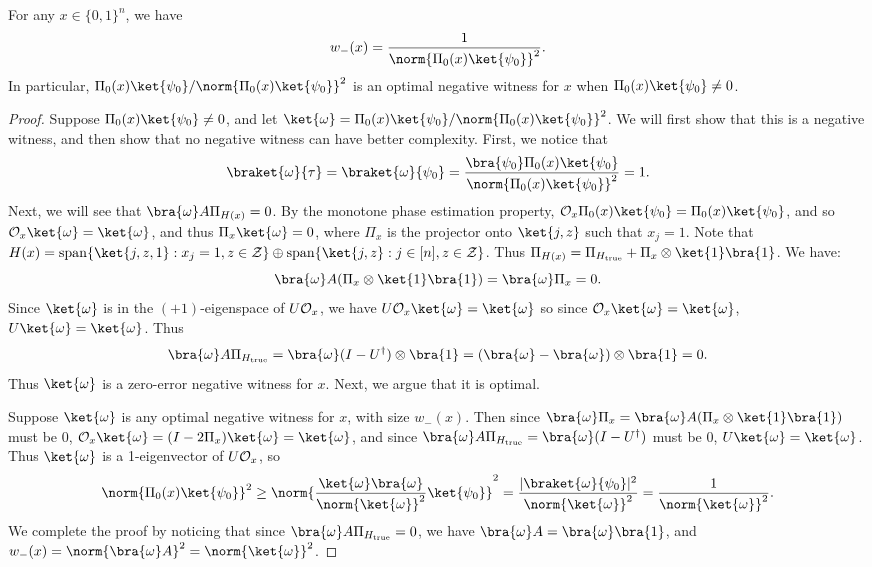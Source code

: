\documentclass{toc}
\begin{document}
\begin{lemma}\label{lem:monotone-alg-neg}
For any $x\in \{0,1\}^n$, we have
$$w_-(x) = \frac{1}{\norm{\Pi_0(x)\ket{\psi_0}}^2}.$$
In particular, $\Pi_0(x)\ket{\psi_0}/\norm{\Pi_0(x)\ket{\psi_0}}^2$ is an optimal negative witness for $x$ when \mbox{$\Pi_0(x)\ket{\psi_0}\neq 0$.} 
\end{lemma}
\begin{proof}
Suppose $\Pi_0(x)\ket{\psi_0}\neq 0$, and let $\ket{\omega}=\Pi_0(x)\ket{\psi_0}/\norm{\Pi_0(x)\ket{\psi_0}}^2$. We will first show that this is a negative witness, and then show that no negative witness can have better complexity. First, we notice that
$$\braket{\omega}{\tau}=\braket{\omega}{\psi_0}=\frac{\bra{\psi_0}\Pi_0(x)\ket{\psi_0}}{\norm{\Pi_0(x)\ket{\psi_0}}^2}=1.$$
Next, we will see that $\bra{\omega}A\Pi_{H(x)}=0$. By the monotone phase estimation property, ${\cal O}_x\Pi_0(x)\ket{\psi_0}=\Pi_0(x)\ket{\psi_0}$, and so ${\cal O}_x\ket{\omega}=\ket{\omega}$, and thus $\Pi_x\ket{\omega}=0$, where $\Pi_x$ is the projector onto $\ket{j,z}$ such that $x_j=1$. Note that $H(x)=\mathrm{span}\{\ket{j,z,1}:x_j=1,z\in{\cal Z}\}\oplus\mathrm{span}\{\ket{j,z}:j\in[n],z\in{\cal Z}\}$. Thus $\Pi_{H(x)}=\Pi_{H_\mathrm{true}}+\Pi_x\otimes\ket{1}\bra{1}$. We have:
$$\bra{\omega}A(\Pi_x\otimes\ket{1}\bra{1}) = \bra{\omega}\Pi_x = 0.$$
Since $\ket{\omega}$ is in the $(+1)$-eigenspace of $U{\cal O}_x$, we have $U{\cal O}_x\ket{\omega}=\ket{\omega}$ so since ${\cal O}_x\ket{\omega}=\ket{\omega}$, $U\ket{\omega}=\ket{\omega}$. Thus
$$\bra{\omega}A\Pi_{H_\mathrm{true}}=\bra{\omega}(I-U^\dagger)\otimes\bra{1}=(\bra{\omega}-\bra{\omega})\otimes \bra{1}=0.$$
Thus $\ket{\omega}$ is a zero-error negative witness for $x$. Next, we argue that it is optimal. 

Suppose $\ket{\omega}$ is any optimal negative witness for $x$, with size $w_-(x)$. Then since $\bra{\omega} \Pi_x=\bra{\omega} A(\Pi_x\otimes\ket{1}\bra{1})$ must be 0, ${\cal O}_x\ket{\omega}=(I-2\Pi_x)\ket{\omega}=\ket{\omega}$, and since $\bra{\omega} A \Pi_{H_{\mathrm{true}}}=\bra{\omega} (I-U^\dagger)$ must be 0, $U\ket{\omega}=\ket{\omega}$. Thus $\ket{\omega}$ is a 1-eigenvector of $U{\cal O}_x$, so 
$$\norm{\Pi_0(x)\ket{\psi_0}}^2\geq \norm{\frac{\ket{\omega}\bra{\omega}}{\norm{\ket{\omega}}^2}\ket{\psi_0}}^2
= \frac{|\braket{\omega}{\psi_0}|^2}{\norm{\ket{\omega}}^2} = \frac{1}{\norm{\ket{\omega}}^2}.$$
We complete the proof by noticing that since $\bra{\omega} A\Pi_{H_{\mathrm{true}}}=0$, we have $\bra{\omega} A = \bra{\omega}\bra{1}$, and $w_-(x)=\norm{\bra{\omega} A}^2 = \norm{\ket{\omega}}^2$.
\end{proof}
\end{document}
